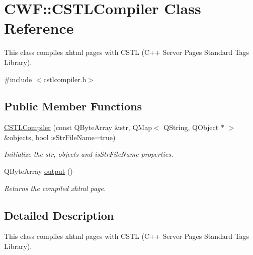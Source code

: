 \hypertarget{class_c_w_f_1_1_c_s_t_l_compiler}{\section{C\+W\+F\+:\+:C\+S\+T\+L\+Compiler Class Reference}
\label{class_c_w_f_1_1_c_s_t_l_compiler}
}


This class compiles xhtml pages with C\+S\+T\+L (C++ Server Pages Standard Tags Library).  




{\ttfamily \#include $<$cstlcompiler.\+h$>$}

\subsection*{Public Member Functions}
\begin{DoxyCompactItemize}
\item 
\hyperlink{class_c_w_f_1_1_c_s_t_l_compiler_a58e8247e5bd5b41a175aee75b9ddf6fc}{C\+S\+T\+L\+Compiler} (const Q\+Byte\+Array \&str, Q\+Map$<$ Q\+String, Q\+Object $\ast$ $>$ \&objects, bool is\+Str\+File\+Name=true)
\begin{DoxyCompactList}\small\item\em Initialize the str, objects and is\+Str\+File\+Name properties. \end{DoxyCompactList}\item 
Q\+Byte\+Array \hyperlink{class_c_w_f_1_1_c_s_t_l_compiler_aa28ba20afd8d5ff643a773d7fa5c0b54}{output} ()
\begin{DoxyCompactList}\small\item\em Returns the compiled xhtml page. \end{DoxyCompactList}\end{DoxyCompactItemize}


\subsection{Detailed Description}
This class compiles xhtml pages with C\+S\+T\+L (C++ Server Pages Standard Tags Library). 


